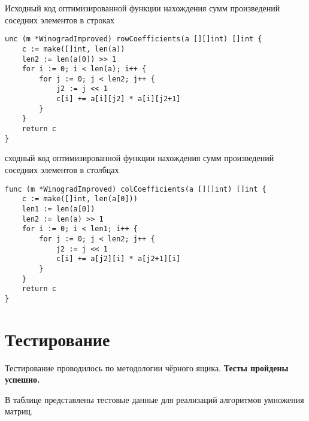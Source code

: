 \newpage

\begin{code}
\caption{Исходный код оптимизированной функции нахождения сумм произведений соседних элементов в строках}
\begin{verbatim}
unc (m *WinogradImproved) rowCoefficients(a [][]int) []int {
	c := make([]int, len(a))
	len2 := len(a[0]) >> 1
	for i := 0; i < len(a); i++ {
		for j := 0; j < len2; j++ {
			j2 := j << 1
			c[i] += a[i][j2] * a[i][j2+1]
		}
	}
	return c
}
\end{verbatim}
\end{code}


\begin{code}
\caption{сходный код оптимизированной функции нахождения сумм произведений соседних элементов в столбцах}
\label{code:winograd-improved-cols}
\begin{verbatim}
func (m *WinogradImproved) colCoefficients(a [][]int) []int {
	c := make([]int, len(a[0]))
	len1 := len(a[0])
	len2 := len(a) >> 1
	for i := 0; i < len1; i++ {
		for j := 0; j < len2; j++ {
			j2 := j << 1
			c[i] += a[j2][i] * a[j2+1][i]
		}
	}
	return c
}
\end{verbatim}
\end{code}

\newpage

\section{Тестирование}
Тестирование проводилось по методологии чёрного ящика. \textbf{Тесты пройдены успешно.}

В таблице  представлены тестовые данные для реализаций алгоритмов умножения матриц. 

